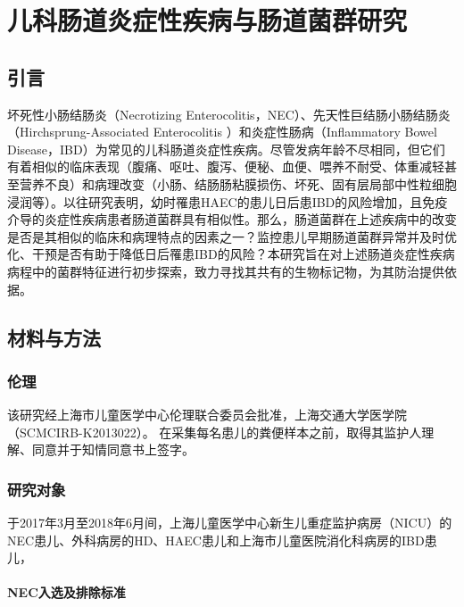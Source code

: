 
\chapter{儿科肠道炎症性疾病与肠道菌群研究}
\label{chap:compare}

\section{引言}
坏死性小肠结肠炎（Necrotizing Enterocolitis，NEC）、先天性巨结肠小肠结肠炎（Hirchsprung-Associated Enterocolitis ）和炎症性肠病（Inflammatory Bowel Disease，IBD）为常见的儿科肠道炎症性疾病\cite{neu2011necrotizing,levine2014espghan,frykman2012hirschsprung}。尽管发病年龄不尽相同，但它们有着相似的临床表现（腹痛、呕吐、腹泻、便秘、血便、喂养不耐受、体重减轻甚至营养不良）和病理改变（小肠、结肠肠粘膜损伤、坏死、固有层局部中性粒细胞浸润等）\cite{yu1980improving}。以往研究表明，幼时罹患HAEC的患儿日后患IBD的风险增加，且免疫介导的炎症性疾病患者肠道菌群具有相似性。那么，肠道菌群在上述疾病中的改变是否是其相似的临床和病理特点的因素之一？监控患儿早期肠道菌群异常并及时优化、干预是否有助于降低日后罹患IBD的风险？本研究旨在对上述肠道炎症性疾病病程中的菌群特征进行初步探索，致力寻找其共有的生物标记物，为其防治提供依据。

\section{材料与方法}
  \subsection{伦理}
  该研究经上海市儿童医学中心伦理联合委员会批准，上海交通大学医学院（SCMCIRB-K2013022）。 在采集每名患儿的粪便样本之前，取得其监护人理解、同意并于知情同意书上签字。
  \subsection{研究对象}
  于2017年3月至2018年6月间，上海儿童医学中心新生儿重症监护病房（NICU）的NEC患儿、外科病房的HD、HAEC患儿和上海市儿童医院消化科病房的IBD患儿，
    \subsubsection{NEC入选及排除标准}
